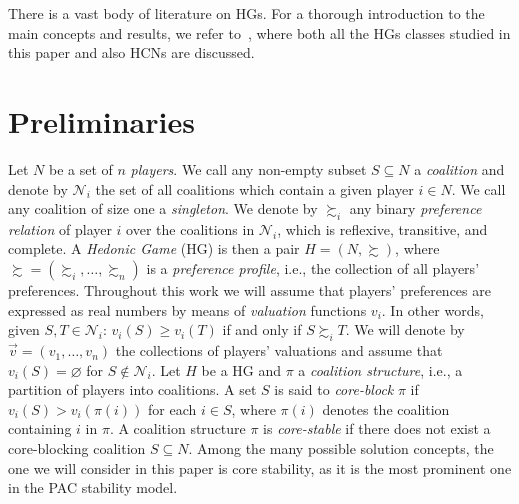 \documentclass[letterpaper]{article} %
\newcommand{\Ni}{\mathcal{N}_i}
\begin{document}
There is a vast body of literature on HGs. For a thorough introduction to the main concepts and results, we refer to~\citet{AzizS16}, where both all the HGs classes studied in this paper and also HCNs are discussed.

\section{Preliminaries}
Let $N$ be a set of $n$ \emph{players}. We call any non-empty subset $S \subseteq N$ a \emph{coalition} and denote by $\Ni$ the set of all coalitions which contain a given player $i \in N$. We call any coalition of size one a \emph{singleton}.
% 
We denote by $\succsim_i$ any binary \emph{preference relation} of player $i$ over the coalitions in $\Ni$, which is reflexive, transitive, and complete.
%
A \emph{Hedonic Game} (HG) is then a pair $H=( N, \succsim )$, where $\succsim = (\succsim_i, \ldots, \succsim_n)$ is a \emph{preference profile}, i.e., the collection of all players' preferences.
%
Throughout this work we will assume that players' preferences are expressed as real numbers by means of \emph{valuation} functions $v_i$. In other words, given $S,T \in \Ni$: $v_i(S) \geq v_i(T)$ if and only if $S \succsim_i T$. We will denote by $\vec{v}=(v_1,\ldots, v_n)$ the collections of players' valuations and assume that $v_i(S)=\varnothing$ for $S\notin \Ni$.
%
Let $H$ be a HG and $\pi$ a \emph{coalition structure}, i.e., a partition of players into coalitions. A set $S$ is said to \emph{core-block} $\pi$ if $v_i(S) > v_i(\pi(i))$ for each $i \in S$, where $\pi(i)$ denotes the coalition containing $i$ in $\pi$. 
%
A coalition structure $\pi$ is \emph{core-stable} if there does not exist a core-blocking coalition $S \subseteq N$. Among the many possible solution concepts, the one we will consider in this paper is core stability, as it is the most prominent one in the PAC stability model.
\end{document}
